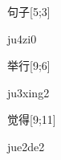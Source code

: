 \begin{verbete}[ju4zi0]{句子}[5;3]
\begin{pronuncia}{ju4zi0}
\end{pronuncia}
\end{verbete}

\begin{verbete}[ju3xing2]{举行}[9;6]
\begin{pronuncia}{ju3xing2}
\end{pronuncia}
\end{verbete}

\begin{verbete}[jue2de2]{觉得}[9;11]
\begin{pronuncia}{jue2de2}
\end{pronuncia}
\end{verbete}

